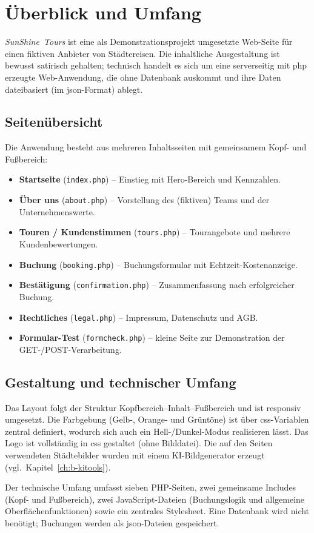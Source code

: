 \chapter{\"Uberblick und Umfang}
\label{ch:b-ueberblick}

\emph{SunShine~Tours} ist eine als Demonstrationsprojekt umgesetzte Web-Seite f\"ur einen
fiktiven Anbieter von St\"adtereisen. Die inhaltliche Ausgestaltung ist bewusst satirisch
gehalten; technisch handelt es sich um eine serverseitig mit \ac{php} erzeugte Web-Anwendung,
die ohne Datenbank auskommt und ihre Daten dateibasiert (im \ac{json}-Format) ablegt.

\section{Seiten\"ubersicht}
Die Anwendung besteht aus mehreren Inhaltsseiten mit gemeinsamem Kopf- und Fu\ss{}bereich:
\begin{itemize}
  \item \textbf{Startseite} (\texttt{index.php}) -- Einstieg mit Hero-Bereich und Kennzahlen.
  \item \textbf{\"Uber uns} (\texttt{about.php}) -- Vorstellung des (fiktiven) Teams und der
        Unternehmenswerte.
  \item \textbf{Touren / Kundenstimmen} (\texttt{tours.php}) -- Tour\-angebote und mehrere
        Kundenbewertungen.
  \item \textbf{Buchung} (\texttt{booking.php}) -- Buchungsformular mit Echtzeit-Kostenanzeige.
  \item \textbf{Best\"atigung} (\texttt{confirmation.php}) -- Zusammenfassung nach erfolgreicher
        Buchung.
  \item \textbf{Rechtliches} (\texttt{legal.php}) -- Impressum, Datenschutz und AGB.
  \item \textbf{Formular-Test} (\texttt{formcheck.php}) -- kleine Seite zur Demonstration der
        GET-/POST-Verarbeitung.
\end{itemize}

\section{Gestaltung und technischer Umfang}
Das Layout folgt der Struktur Kopfbereich--Inhalt--Fu\ss{}bereich und ist responsiv umgesetzt.
Die Farbgebung (Gelb-, Orange- und Gr\"unt\"one) ist \"uber \ac{css}-Variablen zentral definiert,
wodurch sich auch ein Hell-/Dunkel-Modus realisieren l\"asst. Das Logo ist vollst\"andig in
\ac{css} gestaltet (ohne Bilddatei). Die auf den Seiten verwendeten St\"adtebilder wurden mit
einem KI-Bildgenerator erzeugt (vgl.\ Kapitel~\ref{ch:b-kitools}).

Der technische Umfang umfasst sieben PHP-Seiten, zwei gemeinsame Includes (Kopf- und
Fu\ss{}bereich), zwei JavaScript-Dateien (Buchungslogik und allgemeine Oberfl\"achenfunktionen)
sowie ein zentrales Stylesheet. Eine Datenbank wird nicht ben\"otigt; Buchungen werden als
\ac{json}-Dateien gespeichert.
